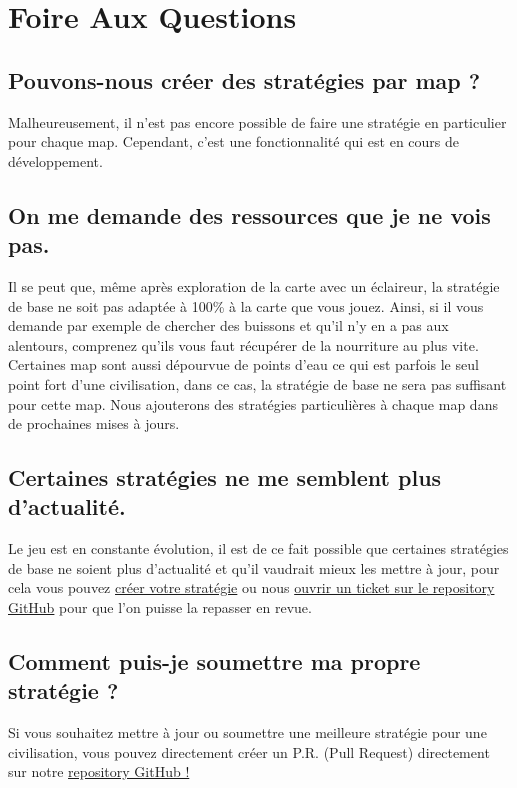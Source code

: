 
\section{Foire Aux Questions}
\label{sec:faq}

\subsection{Pouvons-nous créer des stratégies par map ?}
Malheureusement, il n'est pas encore possible de faire une stratégie en particulier pour chaque map. Cependant, c'est une fonctionnalité qui est en cours de développement.

\subsection{On me demande des ressources que je ne vois pas.}
Il se peut que, même après exploration de la carte avec un éclaireur, la stratégie de base ne soit pas adaptée à 100\% à la carte que vous jouez. Ainsi, si il vous demande par exemple de chercher des buissons et qu'il n'y en a pas aux alentours, comprenez qu'ils vous faut récupérer de la nourriture au plus vite. Certaines map sont aussi dépourvue de points d'eau ce qui est parfois le seul point fort d'une civilisation, dans ce cas, la stratégie de base ne sera pas suffisant pour cette map. Nous ajouterons des stratégies particulières à chaque map dans de prochaines mises à jours.

\subsection{Certaines stratégies ne me semblent plus d'actualité.}
Le jeu est en constante évolution, il est de ce fait possible que certaines stratégies de base ne soient plus d'actualité et qu'il vaudrait mieux les mettre à jour, pour cela vous pouvez \hyperref[sec:configfiles]{créer votre stratégie} ou nous \href{https://github.com/UNamurCSFaculty/2223_INFOB318_Palantir/issues}{ouvrir un ticket sur le repository GitHub} pour que l'on puisse la repasser en revue.

\subsection{Comment puis-je soumettre ma propre stratégie ?}
Si vous souhaitez mettre à jour ou soumettre une meilleure stratégie pour une civilisation, vous pouvez directement créer un P.R. (Pull Request) directement sur notre \href{https://github.com/UNamurCSFaculty/2223_INFOB318_Palantir}{repository GitHub !}

